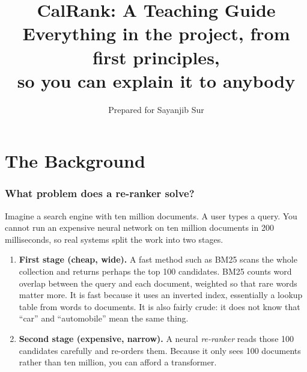 \documentclass[11pt,a4paper]{article}
\title{\bfseries CalRank: A Teaching Guide\\[4pt]
\large Everything in the project, from first principles,\\
so you can explain it to anybody}
\author{Prepared for Sayanjib Sur}
\date{}
\begin{document}
\maketitle
\thispagestyle{empty}

\begin{center}
\end{center}

\tableofcontents
\newpage

\part{The Background}
\section{What problem does a re-ranker solve?}

Imagine a search engine with ten million documents. A user types a query. You cannot
run an expensive neural network on ten million documents in 200 milliseconds, so
real systems split the work into two stages.

\begin{enumerate}[leftmargin=*]
  \item \textbf{First stage (cheap, wide).} A fast method such as BM25 scans the
  whole collection and returns perhaps the top 100 candidates. BM25 counts word
  overlap between the query and each document, weighted so that rare words matter
  more. It is fast because it uses an inverted index, essentially a lookup table
  from words to documents. It is also fairly crude: it does not know that ``car''
  and ``automobile'' mean the same thing.

  \item \textbf{Second stage (expensive, narrow).} A neural \emph{re-ranker} reads
  those 100 candidates carefully and re-orders them. Because it only sees 100
  documents rather than ten million, you can afford a transformer.
\end{enumerate}
\end{document}
